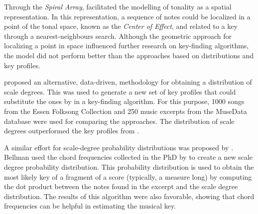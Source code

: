 Through the \emph{Spiral Array}, \textcite{chew2002spiral}
facilitated the modelling of tonality as a spatial
representation. In this representation, a sequence of notes
could be localized in a point of the tonal space, known as
the \emph{Center of Effect}, and related to a key through a
nearest-neighbours search. Although the geometric approach
for localizing a point in space influenced further research
on key-finding algorithms, the model did not perform better
than the approaches based on distributions and key profiles.

\textcite{aarden2003dynamic} proposed an alternative,
data-driven, methodology for obtaining a distribution of
scale degrees. This was used to generate a new set of key
profiles that could substitute the ones by
\textcite{krumhansl1982tracing} in a key-finding algorithm.
For this purpose, 1000 songs from the Essen Folksong
Collection and 250 music excerpts from the MuseData database
were used for comparing the approaches. The distribution of
scale degrees outperformed the key profiles from
\textcite{krumhansl1982tracing}.




A similar effort for scale-degree probability distributions
was proposed by \textcite{bellmann2006about}. Bellman used
the chord frequencies collected in the PhD \thesisdiss{} by
\textcite{budge1943study} to create a new scale degree
probability distribution. This probability distribution is
used to obtain the most likely key of a fragment of a score
(typically, a measure long) by computing the dot product
between the notes found in the excerpt and the scale degree
distribution. The results of this algorithm were also
favorable, showing that chord frequencies can be helpful in
estimating the musical key.



